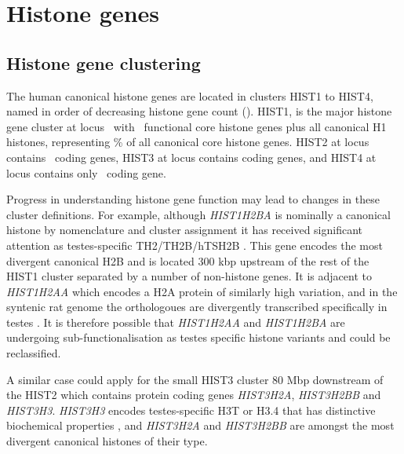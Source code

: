 \section{Histone genes}

\subsection{Histone gene clustering}
	The human canonical histone genes are located in clusters HIST1 to HIST4, 
	named in order of decreasing histone gene count ().
	HIST1, is the major histone gene cluster at locus~\HISTOneLocus{}  
	with \CodingGenesInHISTOne{}~functional core histone genes plus all canonical H1 histones,
	representing \% of all canonical core histone genes. 
	HIST2 at locus~\HISTTwoLocus{} contains \CodingGenesInHISTTwo{}~coding genes, 
	HIST3 at locus \HISTThreeLocus{} contains \CodingGenesInHISTThree{} coding genes, 
	and HIST4 at locus \HISTFourLocus{} contains only \CodingGenesInHISTFour{}~coding gene. 

	Progress in understanding histone gene function may lead to changes in these cluster definitions. 
	For example, although \textit{HIST1H2BA} is nominally a canonical histone 
	by nomenclature and cluster assignment
	it has received significant attention as testes-specific TH2/TH2B/hTSH2B \citep{Zalensky2002,LiAusio2005,Shinagawa2014}.
	This gene encodes the most divergent canonical H2B 
	and is located 300 kbp upstream of the rest of the HIST1 cluster 
	separated by a number of non-histone genes. 
	It is adjacent to \textit{HIST1H2AA} which encodes a H2A protein of similarly high variation, 
	and in the syntenic rat genome the orthologoues are divergently transcribed specifically in testes \citep{HuhChae1991}. 
	It is therefore possible that \textit{HIST1H2AA} and \textit{HIST1H2BA} 
	are undergoing sub-functionalisation as testes specific histone variants and could be reclassified.

	A similar case could apply for the small HIST3 cluster 80 Mbp downstream of the HIST2 
	which contains protein coding genes \textit{HIST3H2A}, \textit{HIST3H2BB} and \textit{HIST3H3}.
	\textit{HIST3H3} encodes testes-specific H3T or H3.4
	that has distinctive biochemical properties \citep{WittExpCellRes1996,KurumizakaCOSB2013}, 
	and \textit{HIST3H2A} and \textit{HIST3H2BB} are amongst the most divergent canonical histones of their type.


